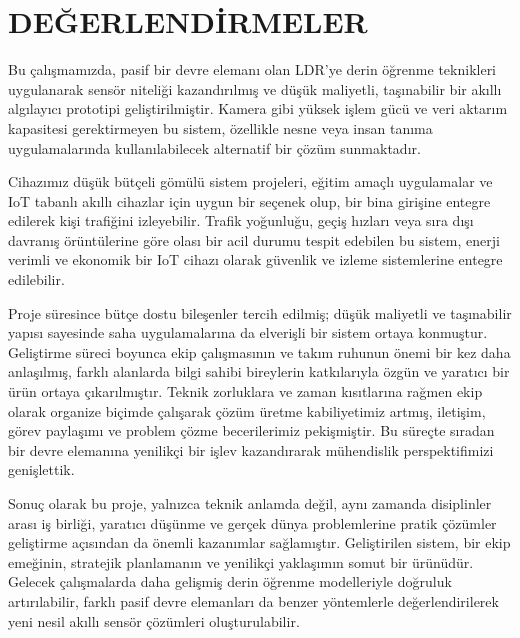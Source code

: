 \section{DEĞERLENDİRMELER}

Bu çalışmamızda, pasif bir devre elemanı olan LDR’ye derin öğrenme teknikleri uygulanarak sensör niteliği kazandırılmış ve düşük maliyetli, taşınabilir bir akıllı algılayıcı prototipi geliştirilmiştir. Kamera gibi yüksek işlem gücü ve veri aktarım kapasitesi gerektirmeyen bu sistem, özellikle nesne veya insan tanıma uygulamalarında kullanılabilecek alternatif bir çözüm sunmaktadır.

Cihazımız düşük bütçeli gömülü sistem projeleri, eğitim amaçlı uygulamalar ve IoT tabanlı akıllı cihazlar için uygun bir seçenek olup, bir bina girişine entegre edilerek kişi trafiğini izleyebilir. Trafik yoğunluğu, geçiş hızları veya sıra dışı davranış örüntülerine göre olası bir acil durumu tespit edebilen bu sistem, enerji verimli ve ekonomik bir IoT cihazı olarak güvenlik ve izleme sistemlerine entegre edilebilir.

Proje süresince bütçe dostu bileşenler tercih edilmiş; düşük maliyetli ve taşınabilir yapısı sayesinde saha uygulamalarına da elverişli bir sistem ortaya konmuştur. Geliştirme süreci boyunca ekip çalışmasının ve takım ruhunun önemi bir kez daha anlaşılmış, farklı alanlarda bilgi sahibi bireylerin katkılarıyla özgün ve yaratıcı bir ürün ortaya çıkarılmıştır. Teknik zorluklara ve zaman kısıtlarına rağmen ekip olarak organize biçimde çalışarak çözüm üretme kabiliyetimiz artmış, iletişim, görev paylaşımı ve problem çözme becerilerimiz pekişmiştir. Bu süreçte sıradan bir devre elemanına yenilikçi bir işlev kazandırarak mühendislik perspektifimizi genişlettik.

Sonuç olarak bu proje, yalnızca teknik anlamda değil, aynı zamanda disiplinler arası iş birliği, yaratıcı düşünme ve gerçek dünya problemlerine pratik çözümler geliştirme açısından da önemli kazanımlar sağlamıştır. Geliştirilen sistem, bir ekip emeğinin, stratejik planlamanın ve yenilikçi yaklaşımın somut bir ürünüdür. Gelecek çalışmalarda daha gelişmiş derin öğrenme modelleriyle doğruluk artırılabilir, farklı pasif devre elemanları da benzer yöntemlerle değerlendirilerek yeni nesil akıllı sensör çözümleri oluşturulabilir.

